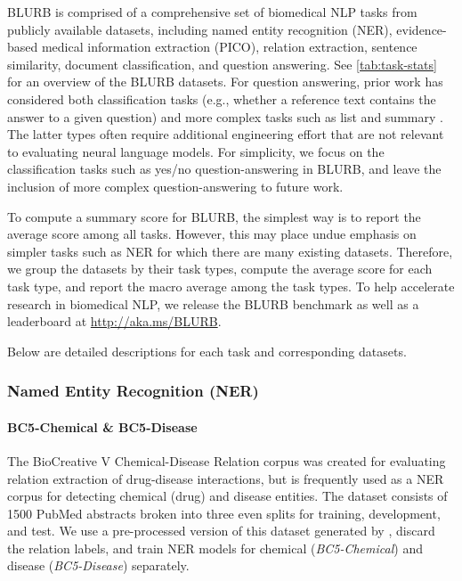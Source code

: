 \documentclass[acmlarge,screen,nonacm]{acmart}
\begin{document}
BLURB is comprised of a comprehensive set of biomedical NLP tasks from publicly available datasets, including named entity recognition (NER), evidence-based medical information extraction (PICO), relation extraction, sentence similarity, document classification, and question answering. 
See \autoref{tab:task-stats} for an overview of the BLURB datasets. 
For question answering, prior work has considered both classification tasks (e.g., whether a reference text contains the answer to a given question) and more complex tasks such as list and summary \cite{nentidis2019results}. The latter types often require additional engineering effort that are not relevant to evaluating neural language models. For simplicity, we focus on the classification tasks such as yes/no question-answering in BLURB, and leave the inclusion of more complex question-answering to future work.

To compute a summary score for BLURB, the simplest way is to report the average score among all tasks. However, this may place undue emphasis on simpler tasks such as NER for which there are many existing datasets. Therefore, we group the datasets by their task types, compute the average score for each task type, and report the macro average among the task types. 
To help accelerate research in biomedical NLP, we release the BLURB benchmark as well as a leaderboard at {\url{http://aka.ms/BLURB}}.

Below are detailed descriptions for each task and corresponding datasets.

\subsubsection{Named Entity Recognition (NER)}
\paragraph{BC5-Chemical \& BC5-Disease} The BioCreative V Chemical-Disease Relation corpus \cite{li2016biocreative} was created for evaluating relation extraction of drug-disease interactions, but is frequently used as a NER corpus for detecting chemical (drug) and disease entities. The dataset consists of 1500 PubMed abstracts broken into three even splits for training, development, and test. We use a pre-processed version of this dataset generated by \citet{crichton2017neural}, discard the relation labels, and train NER models for chemical (\textit{BC5-Chemical}) and disease (\textit{BC5-Disease}) separately.
\end{document}
